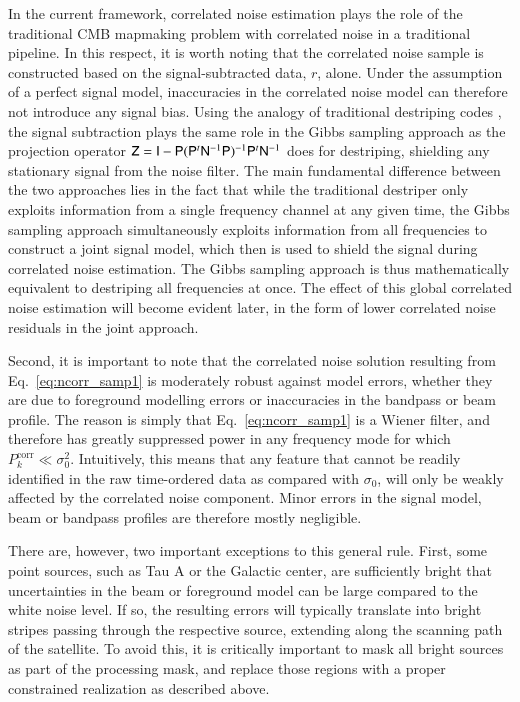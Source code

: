 \documentclass[onecolumn]{aa}
\newcommand{\N}[0]{\tens{N}}
\newcommand{\Z}[0]{\tens{Z}}
\newcommand{\I}[0]{\tens{I}}
\renewcommand{\P}[0]{\tens{P}}
\begin{document}
In the current framework, correlated noise estimation plays the role
of the traditional CMB mapmaking problem with correlated noise in a
traditional pipeline. In this respect, it is worth noting that the
correlated noise sample is constructed based on the signal-subtracted
data, $r$, alone. Under the assumption of a perfect signal model,
inaccuracies in the correlated noise model can therefore not introduce
any signal bias. Using the analogy of traditional destriping codes
\citep[e.g.,][]{Maino1999,Keihanen2004, Keihanen2005,Keihanen2010}, the signal
subtraction plays the same role in the Gibbs sampling approach as the
projection operator $\Z = \I - \P(\P^t \N^{-1}\P)^{-1}\P^t\N^{-1}$
does for destriping, shielding any stationary signal from the noise
filter. The main fundamental difference between the two approaches
lies in the fact that while the traditional destriper only exploits
information from a single frequency channel at any given time, the
Gibbs sampling approach simultaneously exploits information from all
frequencies to construct a joint signal model, which then is used to
shield the signal during correlated noise estimation. The Gibbs
sampling approach is thus mathematically equivalent to destriping all
frequencies at once. The effect of this global correlated noise
estimation will become evident later, in the form of lower correlated
noise residuals in the joint approach.

Second, it is important to note that the correlated noise solution
resulting from Eq.~\eqref{eq:ncorr_samp1} is moderately robust against
model errors, whether they are due to foreground modelling errors or
inaccuracies in the bandpass or beam profile. The reason is simply
that Eq.~\eqref{eq:ncorr_samp1} is a Wiener filter, and therefore has
greatly suppressed power in any frequency mode for which
$P^{\mathrm{corr}}_k \ll \sigma_0^2$. Intuitively, this means that any
feature that cannot be readily identified in the raw time-ordered data
as compared with $\sigma_0$, will only be weakly affected by the
correlated noise component. Minor errors in the signal model, beam or
bandpass profiles are therefore mostly negligible.

There are, however, two important exceptions to this general
rule. First, some point sources, such as Tau A or the Galactic center,
are sufficiently bright that uncertainties in the beam or foreground
model can be large compared to the white noise level. If so, the
resulting errors will typically translate into bright stripes passing
through the respective source, extending along the scanning path of
the satellite. To avoid this, it is critically important to mask all
bright sources as part of the processing mask, and replace those
regions with a proper constrained realization as described above. 
\end{document}
